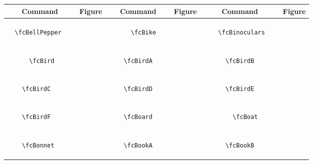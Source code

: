 \documentclass[x11names]{article}
\begin{document}
\begin{table}[H]\centering\begin{tabular}{|c|c|c|c|c|c|}\hline{\bf Command} & {\bf Figure} & {\bf Command} & {\bf Figure} & {\bf Command} & {\bf Figure}\\	\hline	&\multirow{5}{*}{	\fcBellPepper	[scale=0.4]} & &\multirow{5}{*}{	\fcBike	[scale=0.8]} & &\multirow{5}{*}{	\fcBinoculars	[scale=0.4]}\\	& & & & & \\	& & & & & \\	\verb|	\fcBellPepper	| & & \verb|	\fcBike	| & & \verb|	\fcBinoculars	| & \\	& & & & & \\	& & & & & \\	& & & & & \\	\hline									
		&\multirow{5}{*}{	\fcBird	[scale=0.8]} & &\multirow{5}{*}{	\fcBirdA	[scale=0.8]} & &\multirow{5}{*}{	\fcBirdB	[scale=0.8]}\\	& & & & & \\	& & & & & \\	\verb|	\fcBird	| & & \verb|	\fcBirdA	| & & \verb|	\fcBirdB	| & \\	& & & & & \\	& & & & & \\	& & & & & \\	\hline									
		&\multirow{5}{*}{	\fcBirdC	[scale=0.8]} & &\multirow{5}{*}{	\fcBirdD	[scale=0.4]} & &\multirow{5}{*}{	\fcBirdE	[scale=0.4]}\\	& & & & & \\	& & & & & \\	\verb|	\fcBirdC	| & & \verb|	\fcBirdD	| & & \verb|	\fcBirdE	| & \\	& & & & & \\	& & & & & \\	& & & & & \\	\hline									
		&\multirow{5}{*}{	\fcBirdF	[scale=0.8]} & &\multirow{5}{*}{	\fcBoard	[scale=0.4]} & &\multirow{5}{*}{	\fcBoat	[scale=0.8]}\\	& & & & & \\	& & & & & \\	\verb|	\fcBirdF	| & & \verb|	\fcBoard	| & & \verb|	\fcBoat	| & \\	& & & & & \\	& & & & & \\	& & & & & \\	\hline									
		&\multirow{5}{*}{	\fcBonnet	[scale=0.8]} & &\multirow{5}{*}{	\fcBookA	[scale=0.8]} & &\multirow{5}{*}{	\fcBookB	[scale=0.8]}\\	& & & & & \\	& & & & & \\	\verb|	\fcBonnet	| & & \verb|	\fcBookA	| & & \verb|	\fcBookB	| & \\	& & & & & \\	& & & & & \\	& & & & & \\	\hline									

\end{tabular}
\end{table}
\end{document}
